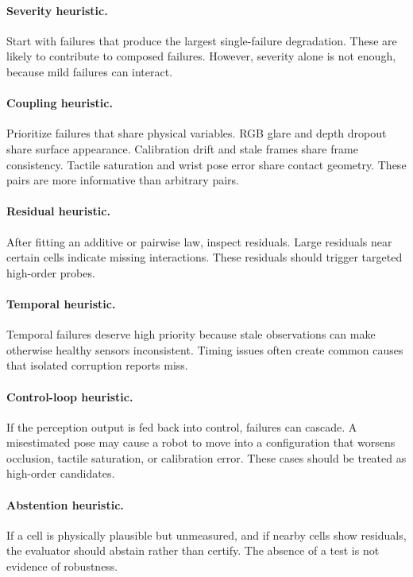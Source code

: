 \documentclass{article}
\begin{document}
\paragraph{Severity heuristic.}
Start with failures that produce the largest single-failure degradation. These are likely to contribute to composed failures. However, severity alone is not enough, because mild failures can interact.

\paragraph{Coupling heuristic.}
Prioritize failures that share physical variables. RGB glare and depth dropout share surface appearance. Calibration drift and stale frames share frame consistency. Tactile saturation and wrist pose error share contact geometry. These pairs are more informative than arbitrary pairs.

\paragraph{Residual heuristic.}
After fitting an additive or pairwise law, inspect residuals. Large residuals near certain cells indicate missing interactions. These residuals should trigger targeted high-order probes.

\paragraph{Temporal heuristic.}
Temporal failures deserve high priority because stale observations can make otherwise healthy sensors inconsistent. Timing issues often create common causes that isolated corruption reports miss.

\paragraph{Control-loop heuristic.}
If the perception output is fed back into control, failures can cascade. A misestimated pose may cause a robot to move into a configuration that worsens occlusion, tactile saturation, or calibration error. These cases should be treated as high-order candidates.

\paragraph{Abstention heuristic.}
If a cell is physically plausible but unmeasured, and if nearby cells show residuals, the evaluator should abstain rather than certify. The absence of a test is not evidence of robustness.
\end{document}

